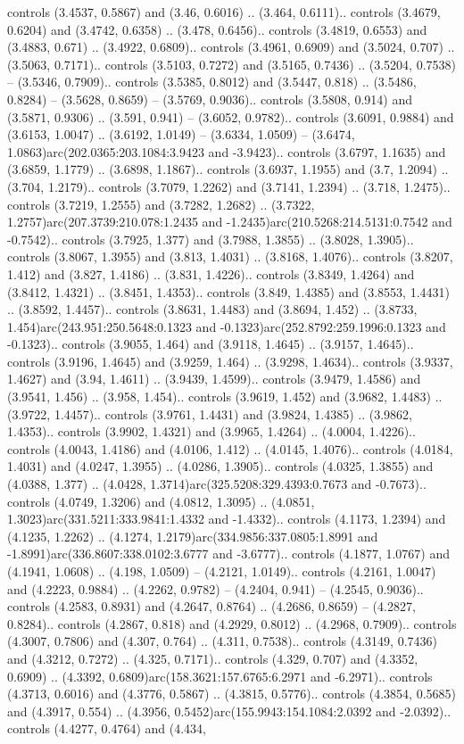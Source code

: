 controls (3.4537, 0.5867) and (3.46, 0.6016) .. (3.464, 0.6111).. controls (3.4679, 0.6204) and (3.4742, 0.6358) .. (3.478, 0.6456).. controls (3.4819, 0.6553) and (3.4883, 0.671) .. (3.4922, 0.6809).. controls (3.4961, 0.6909) and (3.5024, 0.707) .. (3.5063, 0.7171).. controls (3.5103, 0.7272) and (3.5165, 0.7436) .. (3.5204, 0.7538) -- (3.5346, 0.7909).. controls (3.5385, 0.8012) and (3.5447, 0.818) .. (3.5486, 0.8284) -- (3.5628, 0.8659) -- (3.5769, 0.9036).. controls (3.5808, 0.914) and (3.5871, 0.9306) .. (3.591, 0.941) -- (3.6052, 0.9782).. controls (3.6091, 0.9884) and (3.6153, 1.0047) .. (3.6192, 1.0149) -- (3.6334, 1.0509) -- (3.6474, 1.0863)arc(202.0365:203.1084:3.9423 and -3.9423).. controls (3.6797, 1.1635) and (3.6859, 1.1779) .. (3.6898, 1.1867).. controls (3.6937, 1.1955) and (3.7, 1.2094) .. (3.704, 1.2179).. controls (3.7079, 1.2262) and (3.7141, 1.2394) .. (3.718, 1.2475).. controls (3.7219, 1.2555) and (3.7282, 1.2682) .. (3.7322, 1.2757)arc(207.3739:210.078:1.2435 and -1.2435)arc(210.5268:214.5131:0.7542 and -0.7542).. controls (3.7925, 1.377) and (3.7988, 1.3855) .. (3.8028, 1.3905).. controls (3.8067, 1.3955) and (3.813, 1.4031) .. (3.8168, 1.4076).. controls (3.8207, 1.412) and (3.827, 1.4186) .. (3.831, 1.4226).. controls (3.8349, 1.4264) and (3.8412, 1.4321) .. (3.8451, 1.4353).. controls (3.849, 1.4385) and (3.8553, 1.4431) .. (3.8592, 1.4457).. controls (3.8631, 1.4483) and (3.8694, 1.452) .. (3.8733, 1.454)arc(243.951:250.5648:0.1323 and -0.1323)arc(252.8792:259.1996:0.1323 and -0.1323).. controls (3.9055, 1.464) and (3.9118, 1.4645) .. (3.9157, 1.4645).. controls (3.9196, 1.4645) and (3.9259, 1.464) .. (3.9298, 1.4634).. controls (3.9337, 1.4627) and (3.94, 1.4611) .. (3.9439, 1.4599).. controls (3.9479, 1.4586) and (3.9541, 1.456) .. (3.958, 1.454).. controls (3.9619, 1.452) and (3.9682, 1.4483) .. (3.9722, 1.4457).. controls (3.9761, 1.4431) and (3.9824, 1.4385) .. (3.9862, 1.4353).. controls (3.9902, 1.4321) and (3.9965, 1.4264) .. (4.0004, 1.4226).. controls (4.0043, 1.4186) and (4.0106, 1.412) .. (4.0145, 1.4076).. controls (4.0184, 1.4031) and (4.0247, 1.3955) .. (4.0286, 1.3905).. controls (4.0325, 1.3855) and (4.0388, 1.377) .. (4.0428, 1.3714)arc(325.5208:329.4393:0.7673 and -0.7673).. controls (4.0749, 1.3206) and (4.0812, 1.3095) .. (4.0851, 1.3023)arc(331.5211:333.9841:1.4332 and -1.4332).. controls (4.1173, 1.2394) and (4.1235, 1.2262) .. (4.1274, 1.2179)arc(334.9856:337.0805:1.8991 and -1.8991)arc(336.8607:338.0102:3.6777 and -3.6777).. controls (4.1877, 1.0767) and (4.1941, 1.0608) .. (4.198, 1.0509) -- (4.2121, 1.0149).. controls (4.2161, 1.0047) and (4.2223, 0.9884) .. (4.2262, 0.9782) -- (4.2404, 0.941) -- (4.2545, 0.9036).. controls (4.2583, 0.8931) and (4.2647, 0.8764) .. (4.2686, 0.8659) -- (4.2827, 0.8284).. controls (4.2867, 0.818) and (4.2929, 0.8012) .. (4.2968, 0.7909).. controls (4.3007, 0.7806) and (4.307, 0.764) .. (4.311, 0.7538).. controls (4.3149, 0.7436) and (4.3212, 0.7272) .. (4.325, 0.7171).. controls (4.329, 0.707) and (4.3352, 0.6909) .. (4.3392, 0.6809)arc(158.3621:157.6765:6.2971 and -6.2971).. controls (4.3713, 0.6016) and (4.3776, 0.5867) .. (4.3815, 0.5776).. controls (4.3854, 0.5685) and (4.3917, 0.554) .. (4.3956, 0.5452)arc(155.9943:154.1084:2.0392 and -2.0392).. controls (4.4277, 0.4764) and (4.434, 